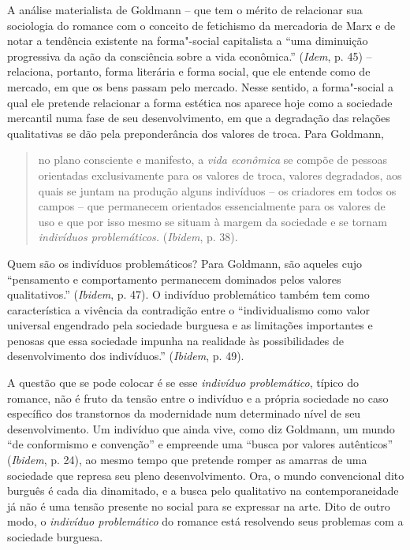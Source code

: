 A análise materialista de Goldmann -- que tem o mérito de relacionar sua
sociologia do romance com o conceito de fetichismo da mercadoria de Marx
e de notar a tendência existente na forma"-social capitalista a ``uma
diminuição progressiva da ação da consciência sobre a vida econômica.''
(\emph{Idem}, p. 45) -- relaciona, portanto, forma literária e forma
social, que ele entende como de mercado, em que os bens passam pelo
mercado. Nesse sentido, a forma"-social a qual ele pretende relacionar a
forma estética nos aparece hoje como a sociedade mercantil numa fase de
seu desenvolvimento, em que a degradação das relações qualitativas se
dão pela preponderância dos valores de troca. Para Goldmann,

\begin{quote}
no plano consciente e manifesto, a \emph{vida econômica} se compõe de
pessoas orientadas exclusivamente para os valores de troca, valores
degradados, aos quais se juntam na produção alguns indivíduos -- os
criadores em todos os campos -- que permanecem orientados essencialmente
para os valores de uso e que por isso mesmo se situam à margem da
sociedade e se tornam \emph{indivíduos problemáticos.} (\emph{Ibidem},
p. 38).
\end{quote}

Quem são os indivíduos problemáticos? Para Goldmann, são aqueles cujo
``pensamento e comportamento permanecem dominados pelos valores
qualitativos.'' (\emph{Ibidem}, p. 47). O indivíduo problemático também
tem como característica a vivência da contradição entre o
``individualismo como valor universal engendrado pela sociedade burguesa
e as limitações importantes e penosas que essa sociedade impunha na
realidade às possibilidades de desenvolvimento dos indivíduos.''
(\emph{Ibidem}, p. 49).

A questão que se pode colocar é se esse \emph{indivíduo problemático},
típico do romance, não é fruto da tensão entre o indivíduo e a própria
sociedade no caso específico dos transtornos da modernidade num
determinado nível de seu desenvolvimento. Um indivíduo que ainda vive,
como diz Goldmann, um mundo ``de conformismo e convenção'' e empreende
uma ``busca por valores autênticos'' (\emph{Ibidem}, p. 24), ao mesmo
tempo que pretende romper as amarras de uma sociedade que represa seu
pleno desenvolvimento. Ora, o mundo convencional dito burguês é cada dia
dinamitado, e a busca pelo qualitativo na contemporaneidade já não é uma
tensão presente no social para se expressar na arte. Dito de outro modo,
o \emph{indivíduo problemático} do romance está resolvendo seus
problemas com a sociedade burguesa.

